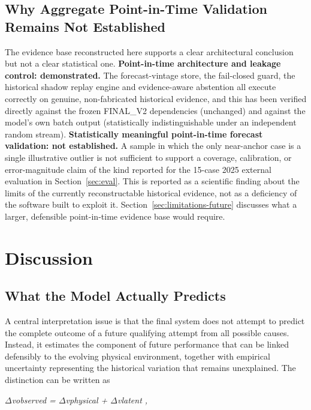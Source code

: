 \subsection{Why Aggregate Point-in-Time Validation Remains Not Established}
The evidence base reconstructed here supports a clear architectural conclusion but not a clear statistical
one. \textbf{Point-in-time architecture and leakage control: demonstrated.} The forecast-vintage store, the
fail-closed guard, the historical shadow replay engine and evidence-aware abstention all execute correctly on
genuine, non-fabricated historical evidence, and this has been verified directly against the frozen FINAL\_V2
dependencies (unchanged) and against the model's own batch output (statistically indistinguishable under an
independent random stream). \textbf{Statistically meaningful point-in-time forecast validation: not
established.} A sample in which the only near-anchor case is a single illustrative outlier is not sufficient
to support a coverage, calibration, or error-magnitude claim of the kind reported for the 15-case 2025
external evaluation in Section~\ref{sec:eval}. This is reported as a scientific finding about the limits of
the currently reconstructable historical evidence, not as a deficiency of the software built to exploit it.
Section~\ref{sec:limitations-future} discusses what a larger, defensible point-in-time evidence base would
require.


\section{Discussion}

\subsection{What the Model Actually Predicts}
A central interpretation issue is that the final system does not attempt to predict the complete outcome of a future qualifying attempt from all possible causes. Instead, it estimates the component of future performance that can be linked defensibly to the evolving physical environment, together with empirical uncertainty representing the historical variation that remains unexplained. The distinction can be written as

\begin{center}\textit{\ensuremath{\Delta}vobserved = \ensuremath{\Delta}vphysical + \ensuremath{\Delta}vlatent ,}\end{center}

